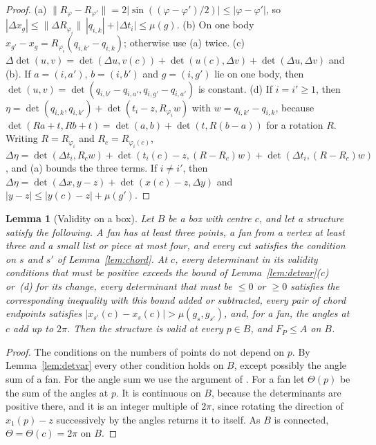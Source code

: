\documentclass[11pt]{amsart}
\newtheorem{lemma}[theorem]{Lemma}
\theoremstyle{definition}
\theoremstyle{remark}
\numberwithin{equation}{section}
\begin{document}
\begin{proof}
(a) $\|R_\varphi-R_{\varphi'}\|=2|\sin((\varphi-\varphi')/2)|\le|\varphi-\varphi'|$, so $|\Delta x_g|\le\|\Delta R_{\varphi_i}\|\,|q_{i,k}|+|\Delta t_i|\le\mu(g)$. (b) On one body $x_{g'}-x_g=R_{\varphi_i}(q_{i,k'}-q_{i,k})$; otherwise use (a) twice. (c) $\Delta\det(u,v)=\det(\Delta u,v(c))+\det(u(c),\Delta v)+\det(\Delta u,\Delta v)$ and (b). If $a=(i,a')$, $b=(i,b')$ and $g=(i,g')$ lie on one body, then $\det(u,v)=\det(q_{i,b'}-q_{i,a'},q_{i,g'}-q_{i,a'})$ is constant. (d) If $i=i'\ge1$, then $\eta=\det(q_{i,k},q_{i,k'})+\det(t_i-z,R_{\varphi_i}w)$ with $w=q_{i,k'}-q_{i,k}$, because $\det(Ra+t,Rb+t)=\det(a,b)+\det(t,R(b-a))$ for a rotation $R$. Writing $R=R_{\varphi_i}$ and $R_c=R_{\varphi_i(c)}$, $\Delta\eta=\det(\Delta t_i,R_cw)+\det(t_i(c)-z,(R-R_c)w)+\det(\Delta t_i,(R-R_c)w)$, and (a) bounds the three terms. If $i\ne i'$, then $\Delta\eta=\det(\Delta x,y-z)+\det(x(c)-z,\Delta y)$ and $|y-z|\le|y(c)-z|+\mu(g')$.
\end{proof}

\begin{lemma}[Validity on a box]\label{lem:valid}
Let $B$ be a box with centre $c$, and let a structure satisfy the following. A fan has at least three points, a fan from a vertex at least three and a small list or piece at most four, and every cut satisfies the condition on $s$ and $s'$ of Lemma~\textup{\ref{lem:chord}}. At $c$, every determinant in its validity conditions that must be positive exceeds the bound of Lemma~\textup{\ref{lem:detvar}(c)} or~\textup{(d)} for its change, every determinant that must be $\le0$ or $\ge0$ satisfies the corresponding inequality with this bound added or subtracted, every pair of chord endpoints satisfies $|x_{s'}(c)-x_s(c)|>\mu(g_s,g_{s'})$, and, for a fan, the angles at $c$ add up to $2\pi$. Then the structure is valid at every $p\in B$, and $F_P\le A$ on $B$.
\end{lemma}

\begin{proof}
The conditions on the numbers of points do not depend on $p$. By Lemma~\ref{lem:detvar} every other condition holds on $B$, except possibly the angle sum of a fan. For the angle sum we use the argument of \cite[Lemma~3.3]{Tom26}. For a fan let $\Theta(p)$ be the sum of the angles at $p$. It is continuous on $B$, because the determinants are positive there, and it is an integer multiple of $2\pi$, since rotating the direction of $x_1(p)-z$ successively by the angles returns it to itself. As $B$ is connected, $\Theta=\Theta(c)=2\pi$ on $B$.
\end{proof}
\end{document}
